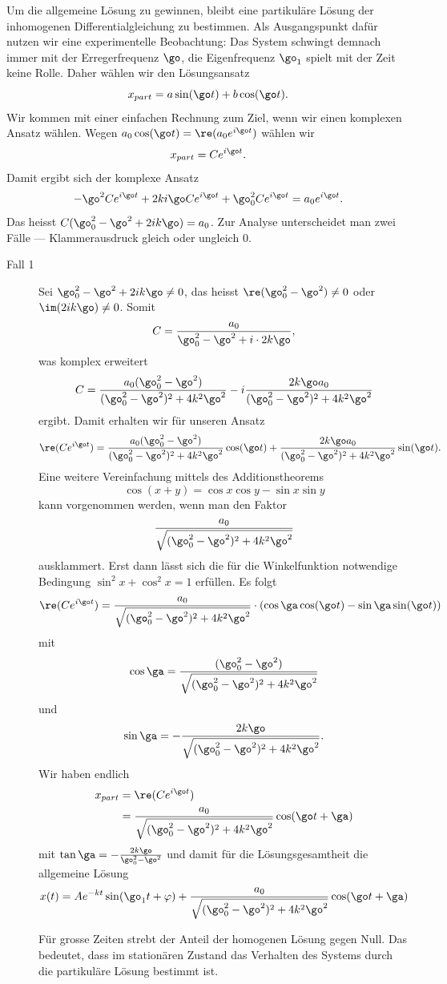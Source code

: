 \documentclass[%
11pt,%
twoside,%
titlepage,%
german,%
headsepline%
]{scrartcl}
\begin{document}
Um die allgemeine L\"osung zu gewinnen, bleibt eine partikul\"are L\"osung der inhomogenen Differentialgleichung zu bestimmen. Als Ausgangspunkt daf\"ur nutzen wir eine experimentelle Beobachtung: Das System schwingt demnach immer mit der Erregerfrequenz $\go$, die Eigenfrequenz $\go_1$ spielt mit der Zeit keine Rolle. Daher w\"ahlen wir den L\"osungsansatz
$$x_{part}=a\sin(\go t)+b\cos(\go t).$$
Wir kommen mit einer einfachen Rechnung zum Ziel, wenn wir einen komplexen Ansatz w\"ahlen. Wegen $a_0\cos(\go t)=\re(a_0e^{i\go t})$ w\"ahlen wir
$$x_{part}=Ce^{i\go t}.$$
Damit ergibt sich der komplexe Ansatz
$$-\go^2Ce^{i\go t}+2ki\go Ce^{i\go t}+\go_0^2Ce^{i\go t}=a_0e^{i\go t}.$$
Das heisst $C(\go_0^2-\go^2+2ik\go)=a_0$. Zur Analyse unterscheidet man zwei F\"alle --- Klammerausdruck gleich oder ungleich $0$.

\begin{description}
\item[Fall 1] Sei $\go_0^2-\go^2+2ik\go\neq0$, das heisst $\re(\go_0^2-\go^2)\neq0$ oder $\im(2ik\go)\neq0$. Somit
$$C=\frac{a_0}{\go_0^2-\go^2+i\cdot 2k\go},$$
was komplex erweitert
$$
C=\frac{a_0(\go_0^2-\go^2)}{(\go_0^2-\go^2)^2+4k^2\go^2}-i\frac{2k\go a_0}{(\go_0^2-\go^2)^2+4k^2\go^2}
$$
ergibt. Damit erhalten wir f\"ur unseren Ansatz
$$
\re(Ce^{i\go t})=\frac{a_0(\go_0^2-\go^2)}{(\go_0^2-\go^2)^2+4k^2\go^2}\cos(\go t)+\frac{2k\go a_0}{(\go_0^2-\go^2)^2+4k^2\go^2}\sin(\go t).
$$
Eine weitere Vereinfachung mittels des Additionstheorems
$$\cos(x+y)=\cos x\cos y-\sin x\sin y$$
kann vorgenommen werden, wenn man den Faktor
$$\frac{a_0}{\sqrt{(\go_0^2-\go^2)^2+4k^2\go^2}}$$
ausklammert. Erst dann l\"asst sich die f\"ur die Winkelfunktion notwendige Bedingung $\sin^2x+\cos^2x=1$ erf\"ullen. Es folgt
$$
\re(Ce^{i\go t})=\frac{a_0}{\sqrt{(\go_0^2-\go^2)^2+4k^2\go^2}}\cdot(\cos\ga\cos(\go t)-\sin\ga\sin(\go t))
$$
mit
$$\cos\ga=\frac{(\go_0^2-\go^2)}{\sqrt{(\go_0^2-\go^2)^2+4k^2\go^2}}$$
und
$$\sin\ga=-\frac{2k\go}{\sqrt{(\go_0^2-\go^2)^2+4k^2\go^2}}.$$
Wir haben endlich
\begin{align*}
x_{part}&=\re(Ce^{i\go t})\\
&=\frac{a_0}{\sqrt{(\go_0^2-\go^2)^2+4k^2\go^2}}\cos(\go t+\ga)
\end{align*}
mit $\tan\ga=-\frac{2k\go}{\go_0^2-\go^2}$ und damit f\"ur die L\"osungsgesamtheit die allgemeine L\"osung
$$
x(t)=Ae^{-kt}\sin(\go_1 t+\varphi)+\frac{a_0}{\sqrt{(\go_0^2-\go^2)^2+4k^2\go^2}}\cos(\go t+\ga)
$$

\begin{bem}
F\"ur grosse Zeiten strebt der Anteil der homogenen L\"osung gegen Null. Das bedeutet, dass im station\"aren Zustand das Verhalten des Systems durch die partikul\"are L\"osung bestimmt ist.
\end{bem}


\end{description}
\end{document}
